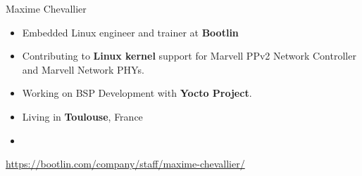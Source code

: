 \begin{frame}{Maxime Chevallier}
    \begin{itemize}
	\item Embedded Linux engineer and trainer at {\bf Bootlin}
	\item Contributing to {\bf Linux kernel} support for Marvell PPv2
		Network Controller and Marvell Network PHYs.
	\item Working on BSP Development with {\bf Yocto Project}.
	\item Living in {\bf Toulouse}, France
	\item {}
    \end{itemize}
    {\small \url{https://bootlin.com/company/staff/maxime-chevallier/}}
\end{frame}
